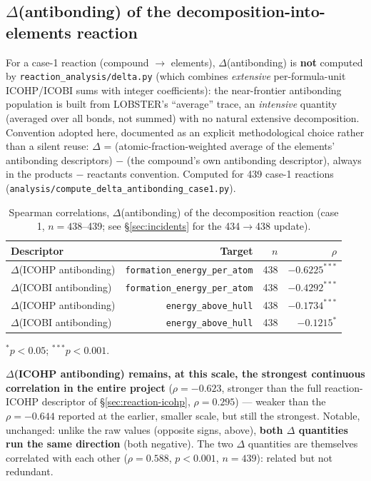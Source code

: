 \documentclass[11pt,a4paper]{article}
\begin{document}
\subsection{$\Delta$(antibonding) of the decomposition-into-elements reaction}

For a case-1 reaction (compound $\to$ elements), $\Delta$(antibonding)
is \textbf{not} computed by \texttt{reaction\_analysis/delta.py} (which
combines \emph{extensive} per-formula-unit ICOHP/ICOBI sums with
integer coefficients): the near-frontier antibonding population is
built from LOBSTER's ``average'' trace, an \emph{intensive}
quantity (averaged over all bonds, not summed) with no natural
extensive decomposition. Convention adopted here, documented as an
explicit methodological choice rather than a silent reuse: $\Delta$ =
(atomic-fraction-weighted average of the elements' antibonding
descriptors) $-$ (the compound's own antibonding descriptor), always
in the products $-$ reactants convention. Computed for 439 case-1
reactions (\texttt{analysis/compute\_delta\_antibonding\_case1.py}).

\begin{table}[htbp]
\centering
\caption{Spearman correlations, $\Delta$(antibonding) of the decomposition reaction (case 1, $n=438$--439; see \S\ref{sec:incidents} for the 434$\to$438 update).}
\label{tab:delta-antibonding}
\begin{tabular}{@{}lrrr@{}}
\toprule
Descriptor & Target & $n$ & $\rho$ \\
\midrule
$\Delta$(ICOHP antibonding) & \texttt{formation\_energy\_per\_atom} & 438 & $-0.6225^{***}$ \\
$\Delta$(ICOBI antibonding) & \texttt{formation\_energy\_per\_atom} & 438 & $-0.4292^{***}$ \\
$\Delta$(ICOHP antibonding) & \texttt{energy\_above\_hull} & 438 & $-0.1734^{***}$ \\
$\Delta$(ICOBI antibonding) & \texttt{energy\_above\_hull} & 438 & $-0.1215^{*}$ \\
\bottomrule
\end{tabular}

\vspace{0.15cm}
{\footnotesize $^{*}p<0.05$; $^{***}p<0.001$.}
\end{table}

\textbf{$\Delta$(ICOHP antibonding) remains, at this scale, the
strongest continuous correlation in the entire project}
($\rho=-0.623$, stronger than the full reaction-ICOHP descriptor of
\S\ref{sec:reaction-icohp}, $\rho=0.295$) --- weaker than the
$\rho=-0.644$ reported at the earlier, smaller scale, but still the
strongest. Notable, unchanged: unlike the raw values (opposite signs,
above), \textbf{both $\Delta$ quantities run the same direction} (both
negative). The two $\Delta$ quantities are themselves correlated with
each other ($\rho=0.588$, $p<0.001$, $n=439$): related but not
redundant.
\end{document}
